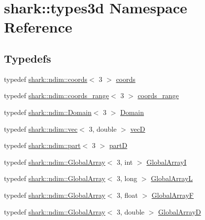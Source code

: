 \hypertarget{namespaceshark_1_1types3d}{}\section{shark\+:\+:types3d Namespace Reference}
\label{namespaceshark_1_1types3d}
\subsection*{Typedefs}
\begin{DoxyCompactItemize}
\item 
typedef \hyperlink{structshark_1_1ndim_1_1coords}{shark\+::ndim\+::coords}$<$ 3 $>$ \hyperlink{namespaceshark_1_1types3d_a3a9d2663241eac116f9af8cdc794d44b}{coords}
\item 
typedef \hyperlink{structshark_1_1ndim_1_1coords__range}{shark\+::ndim\+::coords\+\_\+range}$<$ 3 $>$ \hyperlink{namespaceshark_1_1types3d_aae18640a2350efcb3ecab3514adff75e}{coords\+\_\+range}
\item 
typedef \hyperlink{classshark_1_1ndim_1_1_domain}{shark\+::ndim\+::\+Domain}$<$ 3 $>$ \hyperlink{namespaceshark_1_1types3d_a112a0578e6b907e595ac18e1f5c97661}{Domain}
\item 
typedef \hyperlink{structshark_1_1ndim_1_1vec}{shark\+::ndim\+::vec}$<$ 3, double $>$ \hyperlink{namespaceshark_1_1types3d_a2ad4ea08e8e6d62a99ffef91988c717c}{vecD}
\item 
typedef \hyperlink{structshark_1_1ndim_1_1part}{shark\+::ndim\+::part}$<$ 3 $>$ \hyperlink{namespaceshark_1_1types3d_a8ba1ca83346f7674ce78342d0dc516ce}{partD}
\item 
typedef \hyperlink{classshark_1_1ndim_1_1_global_array}{shark\+::ndim\+::\+Global\+Array}$<$ 3, int $>$ \hyperlink{namespaceshark_1_1types3d_a7f31ca9637cd289d819d1d736513dfc0}{Global\+ArrayI}
\item 
typedef \hyperlink{classshark_1_1ndim_1_1_global_array}{shark\+::ndim\+::\+Global\+Array}$<$ 3, long $>$ \hyperlink{namespaceshark_1_1types3d_a931d8d19c72c6e4deb52443dd3fa4c3f}{Global\+ArrayL}
\item 
typedef \hyperlink{classshark_1_1ndim_1_1_global_array}{shark\+::ndim\+::\+Global\+Array}$<$ 3, float $>$ \hyperlink{namespaceshark_1_1types3d_aa7b35ad09a98a11a86cd9aa4097a7f42}{Global\+ArrayF}
\item 
typedef \hyperlink{classshark_1_1ndim_1_1_global_array}{shark\+::ndim\+::\+Global\+Array}$<$ 3, double $>$ \hyperlink{namespaceshark_1_1types3d_adec078931cbcd64a77c14b21c5d631d0}{Global\+ArrayD}

\end{DoxyCompactItemize}

